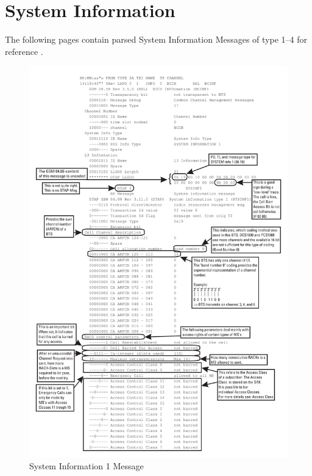 \chapter{System Information}
\label{sec:system_infos}
The following pages contain parsed System Information Messages of type 1--4  for reference \cite{protocols1999}.
\begin{figure}
\centering
\includegraphics[width=.9\textwidth]{../Images/sysinfo1}
\caption{System Information 1 Message}
\end{figure}
